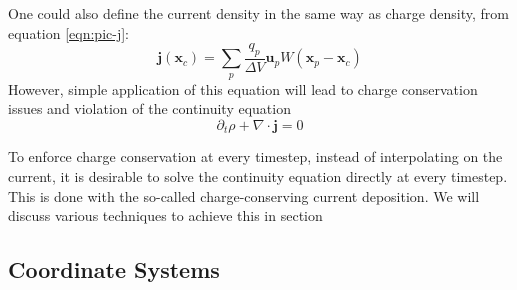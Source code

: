 One could also define the current density in the same way as charge density,
from equation \eqref{eqn:pic-j}:
\begin{equation}
  \mathbf{j} ( \mathbf{x}_{c} ) = \sum_{p} \frac{q_{p}}{\Delta V}\mathbf{u}_p W (
  \mathbf{x}_{p} -\mathbf{x}_{c} )
\end{equation}
However, simple application of this equation will lead to charge
conservation issues and violation of the continuity equation
\begin{equation}
    \label{eq:18}
    \partial_t\rho + \nabla\cdot \mathbf{j} = 0
\end{equation}

To enforce charge conservation at every timestep, instead of interpolating on
the current, it is desirable to solve the continuity equation directly at every
timestep. This is done with the so-called charge-conserving current deposition.
We will discuss various techniques to achieve this in section %




\subsection{Coordinate Systems}
\label{sec:coord-syst-sing}

